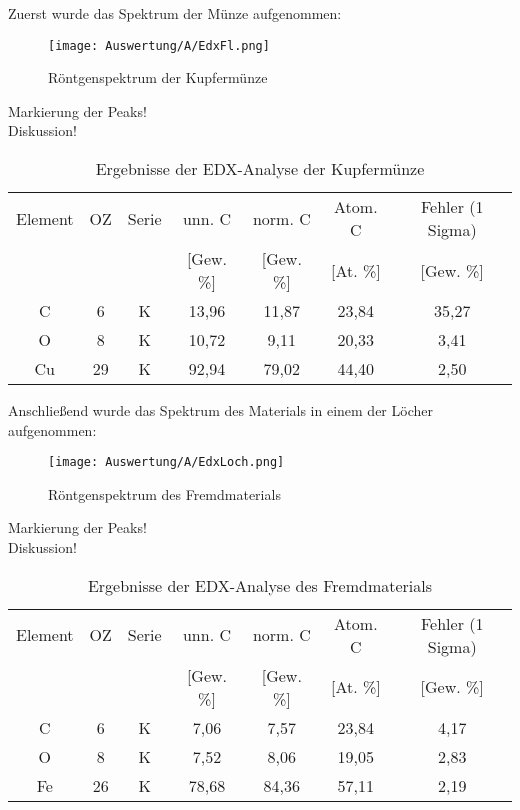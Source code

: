 Zuerst wurde das Spektrum der Münze aufgenommen: 
\begin{figure}[h]
    \centering
    \texttt{[image: Auswertung/A/EdxFl.png]}
    \caption{Röntgenspektrum der Kupfermünze}
\end{figure}

Markierung der Peaks!\\
Diskussion!\\

\begin{table}[h]
    \centering
    \begin{tabular}{c|c|c|c|c|c|c}
        Element & OZ &Serie& unn. C & norm. C &  Atom. C  & Fehler (1 Sigma) \\
         & & & [Gew. \%] & [Gew. \%] & [At. \%] & [Gew. \%] \\
        \hline\hline
        C & 6 & K & 13,96&11,87&23,84 & 35,27\\
        O & 8 & K & 10,72&9,11&20,33 & 3,41\\
        Cu & 29 & K & 92,94&79,02&44,40 & 2,50\\
    \end{tabular}
    \caption{Ergebnisse der EDX-Analyse der Kupfermünze}
\end{table}

\newpage
Anschließend wurde das Spektrum des Materials in einem der Löcher aufgenommen: 
\begin{figure}[h]
    \centering
    \texttt{[image: Auswertung/A/EdxLoch.png]}
    \caption{Röntgenspektrum des Fremdmaterials}
\end{figure}

Markierung der Peaks!\\
Diskussion!\\

\begin{table}[h]
    \centering
    \begin{tabular}{c|c|c|c|c|c|c}
        Element & OZ &Serie& unn. C & norm. C &  Atom. C  & Fehler (1 Sigma) \\
         & & & [Gew. \%] & [Gew. \%] & [At. \%] & [Gew. \%] \\
        \hline\hline
        C & 6 & K & 7,06&7,57&23,84 & 4,17\\
        O & 8 & K & 7,52&8,06&19,05 & 2,83\\
        Fe & 26 & K & 78,68&84,36&57,11 & 2,19\\
    \end{tabular}
    \caption{Ergebnisse der EDX-Analyse des Fremdmaterials}
\end{table}

